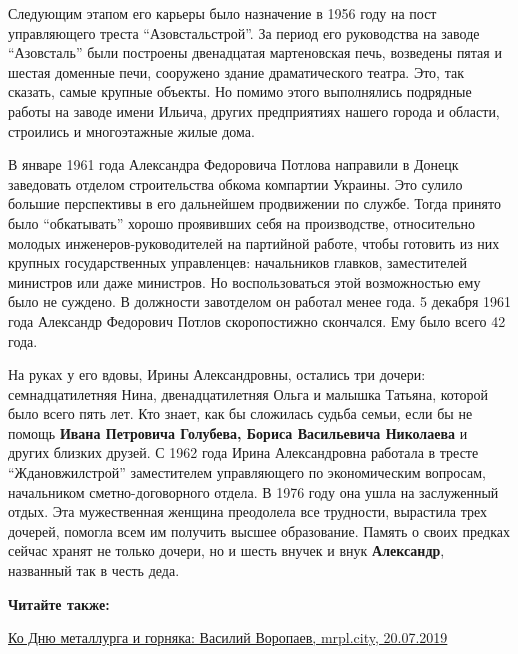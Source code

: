 Следующим этапом его карьеры было назначение в 1956 году на пост управляющего
треста \enquote{Азовстальстрой}. За период его руководства на заводе \enquote{Азовсталь} были
построены двенадцатая мартеновская печь, возведены пятая и шестая доменные
печи, сооружено здание драматического театра. Это, так сказать, самые крупные
объекты. Но помимо этого выполнялись подрядные работы на заводе имени Ильича,
других предприятиях нашего города и области, строились и многоэтажные жилые
дома.

В январе 1961 года Александра Федоровича Потлова направили в Донецк заведовать
отделом строительства обкома компартии Украины. Это сулило большие перспективы
в его дальнейшем продвижении по службе. Тогда принято было \enquote{обкатывать} хорошо
проявивших себя на производстве, относительно молодых инженеров-руководителей
на партийной работе, чтобы готовить из них крупных государственных управленцев:
начальников главков, заместителей министров или даже министров. Но
воспользоваться этой возможностью ему было не суждено. В должности завотделом
он работал менее года. 5 декабря 1961 года Александр Федорович Потлов
скоропостижно скончался. Ему было всего 42 года. 

На руках у его вдовы, Ирины Александровны, остались три дочери:
семнадцатилетняя Нина, двенадцатилетняя Ольга и малышка Татьяна, которой было
всего пять лет. Кто знает, как бы сложилась судьба семьи, если бы не помощь
\textbf{Ивана Петровича Голубева, Бориса Васильевича Николаева} и других близких друзей.
С 1962 года Ирина Александровна работала в тресте \enquote{Ждановжилстрой} заместителем
управляющего по экономическим вопросам, начальником сметно-договорного отдела.
В 1976 году она ушла на заслуженный отдых. Эта мужественная женщина преодолела
все трудности, вырастила трех дочерей, помогла всем им получить высшее
образование. Память о своих предках сейчас хранят не только дочери, но и шесть
внучек и внук \textbf{Александр}, названный так в честь деда.

\textbf{Читайте также:}

\href{https://archive.org/details/20_07_2019.stz.news.ua.mrpl_city.1.ko_dnu_metallurga_i_gornjaka_vasilij_voropaev}{%
Ко Дню металлурга и горняка: Василий Воропаев, mrpl.city, 20.07.2019}
